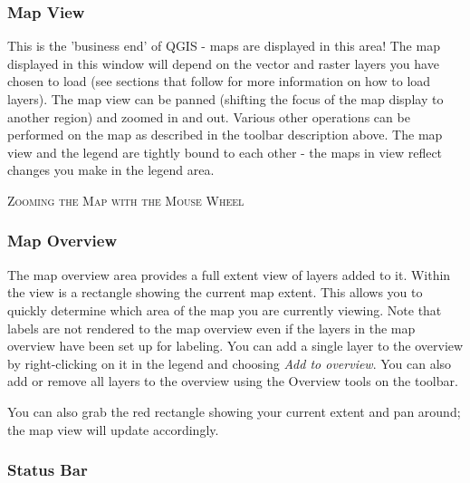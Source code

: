 \subsubsection{Map View}\label{label_mapview}

This is the 'business end' of QGIS - maps are displayed in this area! The
map displayed in this window will depend on the vector and raster layers you
have chosen to load (see sections that follow for more information on how to
load layers). The map view can be panned (shifting the focus of the map display
to another region) and zoomed in and out. Various other operations can be
performed on the map as described in the toolbar description above.  The map
view and the legend are tightly bound to each other - the maps in view reflect
changes you make in the legend area.  

\begin{Tip}\caption{\textsc{Zooming the Map with the Mouse
Wheel}}
\end{Tip}

\subsubsection{Map Overview}\label{label_mapoverview}

The map overview area provides a full extent view of layers added to it.
Within the view is a rectangle showing the current map extent. This allows
you to quickly determine which area of the map you are currently viewing. Note
that labels are not rendered to the map overview even if the layers in the
map overview have been set up for labeling. 
You can add a single layer to the
overview by right-clicking on it in the legend and choosing \textit{Add
to overview}. You can also add or remove all layers to the overview using the
Overview tools on the toolbar.

You can also grab the red rectangle showing your current extent and pan around; the
map view will update accordingly.


\subsubsection{Status Bar}\label{label_statusbar}

